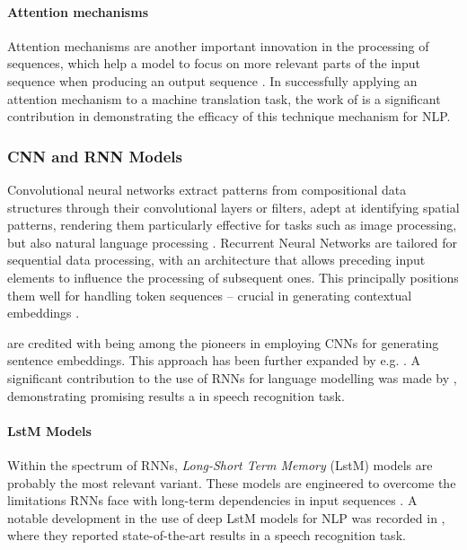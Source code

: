 \documentclass[11pt]{scrreprt}
\let\citef\cite  %
\let\cite\parencite  %
\begin{document}
\paragraph{Attention mechanisms}
Attention mechanisms are another important innovation in the processing of sequences, which help a model to focus on more relevant parts of the input sequence when producing an output sequence \cite{galassiAttentionNaturalLanguage2021}. In successfully applying an attention mechanism to a machine translation task, the work of \citef{bahdanauNeuralMachineTranslation2016}  is a significant contribution in demonstrating the efficacy of this technique mechanism for NLP.


\subsubsection{CNN and RNN Models}
Convolutional neural networks extract patterns from compositional data structures through their convolutional layers or filters, adept at identifying spatial patterns, rendering them particularly effective for tasks such as image processing, but also natural language processing \cite{albawiUnderstandingConvolutionalNeural2017}. Recurrent Neural Networks are tailored for sequential data processing, with an architecture that allows preceding input elements to influence the processing of subsequent ones. This principally positions them well for handling token sequences -- crucial in generating contextual embeddings \cite{yuReviewRecurrentNeural2019}.

\citef{collobertUnifiedArchitectureNatural2008} are credited with being among the pioneers in employing CNNs for generating sentence embeddings. This approach has been further expanded by e.g.  \citef{kalchbrennerConvolutionalNeuralNetwork2014}. A significant contribution to the use of RNNs for language modelling was made by \citef{mikolovRecurrentNeuralNetwork2010}, demonstrating promising results a in speech recognition task.


\paragraph{L\gls{st}M Models}
Within the spectrum of RNNs, \textit{Long-Short Term Memory} (L\gls{st}M) models are probably the most relevant variant. These models are engineered to overcome the limitations RNNs face with long-term dependencies in input sequences \cite{hochreiterLongShortTermMemory1997, yuReviewRecurrentNeural2019}. A notable development in the use of deep L\gls{st}M models for NLP was recorded in \citef{gravesSpeechRecognitionDeep2013}, where they reported state-of-the-art results in a speech recognition task.
\end{document}
